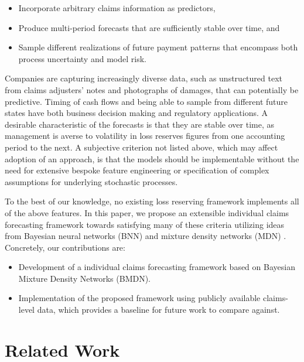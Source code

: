 \documentclass{article}
\begin{document}
\begin{itemize}
	\item Incorporate arbitrary claims information as predictors,
	\item Produce multi-period forecasts that are sufficiently stable over time, and
	\item Sample different realizations of future payment patterns that encompass both process uncertainty and model risk.
\end{itemize}
Companies are capturing increasingly diverse data, such as unstructured text from claims adjusters' notes and photographs of damages, that can potentially be predictive. Timing of cash flows and being able to sample from different future states have both business decision making and regulatory applications. A desirable characteristic of the forecasts is that they are stable over time, as management is averse to volatility in loss reserves figures from one accounting period to the next. A subjective criterion not listed above, which may affect adoption of an approach, is that the models should be implementable without the need for extensive bespoke feature engineering or specification of complex assumptions for underlying stochastic processes.

To the best of our knowledge, no existing loss reserving framework implements all of the above features. In this paper, we propose an extensible individual claims forecasting framework towards satisfying many of these criteria utilizing ideas from Bayesian neural networks (BNN) \cite{nealBayesianLearning2012} and mixture density networks (MDN) \cite{bishopMixtureDensity1994}. Concretely, our contributions are:

\begin{itemize}
	\item Development of a individual claims forecasting framework based on Bayesian Mixture Density Networks (BMDN).
	\item Implementation of the proposed framework using publicly available claims-level data, which provides a baseline for future work to compare against.
\end{itemize}

\section{Related Work}
\end{document}
